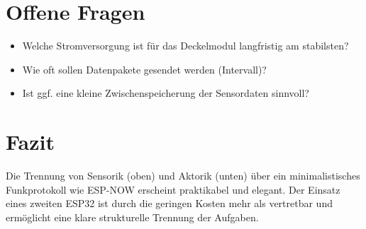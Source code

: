 \documentclass[11pt,a4paper]{article}
\begin{document}
\section*{Offene Fragen}
\begin{itemize}
  \item Welche Stromversorgung ist für das Deckelmodul langfristig am stabilsten?
  \item Wie oft sollen Datenpakete gesendet werden (Intervall)?
  \item Ist ggf. eine kleine Zwischenspeicherung der Sensordaten sinnvoll?
\end{itemize}

\section*{Fazit}
Die Trennung von Sensorik (oben) und Aktorik (unten) über ein minimalistisches Funkprotokoll wie ESP-NOW erscheint praktikabel und elegant. Der Einsatz eines zweiten ESP32 ist durch die geringen Kosten mehr als vertretbar und ermöglicht eine klare strukturelle Trennung der Aufgaben.
\end{document}

